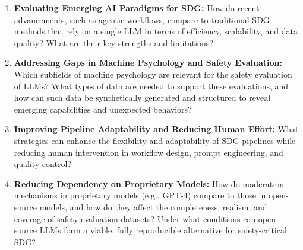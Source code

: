 \documentclass[12pt,a4paper]{article}
\begin{document}
\begin{enumerate}
    \item \textbf{Evaluating Emerging AI Paradigms for SDG:}  
    How do recent advancements, such as agentic workflows, compare to traditional SDG methods that rely on a single LLM in terms of efficiency, scalability, and data quality? What are their key strengths and limitations?

    \item \textbf{Addressing Gaps in Machine Psychology and Safety Evaluation:}  
    Which subfields of machine psychology are relevant for the safety evaluation of LLMs? What types of data are needed to support these evaluations, and how can such data be synthetically generated and structured to reveal emerging capabilities and unexpected behaviors?

    \item \textbf{Improving Pipeline Adaptability and Reducing Human Effort:}
    What strategies can enhance the flexibility and adaptability of SDG pipelines while reducing human intervention in workflow design, prompt engineering, and quality control?

    \item \textbf{Reducing Dependency on Proprietary Models:}  
    How do moderation mechanisms in proprietary models (e.g., GPT-4) compare to those in open-source models, and how do they affect the completeness, realism, and coverage of safety evaluation datasets? 
    Under what conditions can open-source LLMs form a viable, fully reproducible alternative for safety-critical SDG?

    
\end{enumerate}
\end{document}
